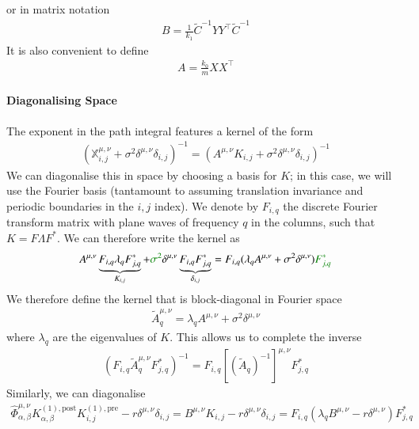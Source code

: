 \documentclass[../main.tex]{subfiles}
\begin{document}
or in matrix notation
\begin{align*}
    B = \frac{1}{k_1} \tilde C^{-1} Y Y^{\top} \tilde C^{-1}
\end{align*}
It is also convenient to define
\begin{align*}
    A = \frac{k_0}{m} X X^{\top}
\end{align*}

\paragraph{Diagonalising Space}

The exponent in the path integral features a kernel of the form
\begin{align*}
    ( \mathbb X^{\mu,\nu}_{i,j} + \sigma^2 \delta^{\mu,\nu} \delta_{i,j} )^{-1}
    =
    ( A^{\mu,\nu} K_{i,j} + \sigma^2 \delta^{\mu,\nu} \delta_{i,j})^{-1}
\end{align*}
We can diagonalise this in space by choosing a basis for $K$; in this case, we will use the Fourier basis (tantamount to assuming translation invariance and periodic boundaries in the $i,j$ index). We denote by $F_{i,q}$ the discrete Fourier transform matrix with plane waves of frequency $q$ in the columns, such that $K = F \Lambda F^{*}$. We can therefore write the kernel as
\begin{align*}
    A^{\mu,\nu} \underbrace{ F_{i,q} \lambda_{q} F^*_{j,q} }_{K_{i,j}} + \typo{\sigma^2} \delta^{\mu,\nu} \underbrace{ F_{i,q} F^*_{j,q} }_{\delta_{i,j}}
    =
    F_{i,q} ( \lambda_{q} A^{\mu,\nu} + \sigma^2 \delta^{\mu,\nu}) \typo{F^*_{j,q}}
\end{align*}
We therefore define the kernel that is block-diagonal in Fourier space
\begin{align*}
    \tilde A^{\mu,\nu}_{q} = \lambda_q A^{\mu,\nu} + \sigma^2 \delta^{\mu,\nu}
\end{align*}
where $\lambda_q$ are the eigenvalues of $K$. This allows us to complete the inverse
\begin{align*}
    (F_{i,q} \tilde A^{\mu,\nu}_{q} F^*_{j,q})^{-1}
    =
    F_{i,q} [(\tilde A_{q})^{-1}]^{\mu,\nu} F^*_{j,q}
\end{align*}
Similarly, we can diagonalise
\begin{align*}
    \hat \Phi^{\mu,\nu}_{\alpha,\beta} K^{(1),\text{post}}_{\alpha,\beta} K^{(1),\text{pre}}_{i,j} - r \delta^{\mu,\nu} \delta_{i,j}
    =
    B^{\mu,\nu} K_{i,j} - r \delta^{\mu,\nu} \delta_{i,j}
    =
    F_{i,q} ( \lambda_q B^{\mu,\nu} - r \delta^{\mu,\nu} ) F^*_{j,q}
\end{align*}
\end{document}
